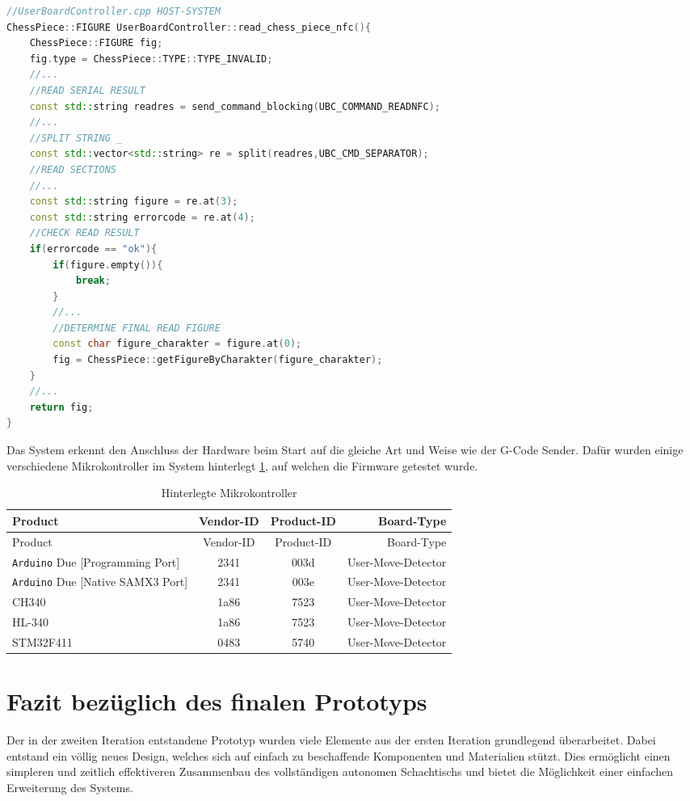 \begin{lstlisting}[language={C++}]
//UserBoardController.cpp HOST-SYSTEM
ChessPiece::FIGURE UserBoardController::read_chess_piece_nfc(){
    ChessPiece::FIGURE fig;
    fig.type = ChessPiece::TYPE::TYPE_INVALID;
    //...
    //READ SERIAL RESULT
    const std::string readres = send_command_blocking(UBC_COMMAND_READNFC);
    //...
    //SPLIT STRING _
    const std::vector<std::string> re = split(readres,UBC_CMD_SEPARATOR);
    //READ SECTIONS
    //...
    const std::string figure = re.at(3);
    const std::string errorcode = re.at(4);
    //CHECK READ RESULT
    if(errorcode == "ok"){
        if(figure.empty()){
            break;
        }
        //...
        //DETERMINE FINAL READ FIGURE
        const char figure_charakter = figure.at(0);
        fig = ChessPiece::getFigureByCharakter(figure_charakter);
    }
    //...
    return fig;
}
\end{lstlisting}

Das System erkennt den Anschluss der Hardware beim Start auf die gleiche
Art und Weise wie der G-Code Sender. Dafür wurden einige verschiedene
Mikrokontroller im System hinterlegt \ref{umbdctl}, auf welchen die
Firmware getestet wurde.

\begin{longtable}[]{@{}lccr@{}}
\caption{Hinterlegte Mikrokontroller \label{umbdctl}}\tabularnewline
\toprule
Product & Vendor-ID & Product-ID & Board-Type\tabularnewline
\midrule
\endfirsthead
\toprule
Product & Vendor-ID & Product-ID & Board-Type\tabularnewline
\midrule
\endhead
\passthrough{\lstinline!Arduino!} Due {[}Programming Port{]} & 2341 &
003d & User-Move-Detector\tabularnewline
\passthrough{\lstinline!Arduino!} Due {[}Native SAMX3 Port{]} & 2341 &
003e & User-Move-Detector\tabularnewline
CH340 & 1a86 & 7523 & User-Move-Detector\tabularnewline
HL-340 & 1a86 & 7523 & User-Move-Detector\tabularnewline
STM32F411 & 0483 & 5740 & User-Move-Detector\tabularnewline
\bottomrule
\end{longtable}

\hypertarget{fazit-bezuxfcglich-des-finalen-prototyps}{%
\section{Fazit bezüglich des finalen
Prototyps}\label{fazit-bezuxfcglich-des-finalen-prototyps}}

Der in der zweiten Iteration entstandene Prototyp wurden viele Elemente
aus der ersten Iteration grundlegend überarbeitet. Dabei entstand ein
völlig neues Design, welches sich auf einfach zu beschaffende
Komponenten und Materialien stützt. Dies ermöglicht einen simpleren und
zeitlich effektiveren Zusammenbau des vollständigen autonomen
Schachtischs und bietet die Möglichkeit einer einfachen Erweiterung des
Systems.

